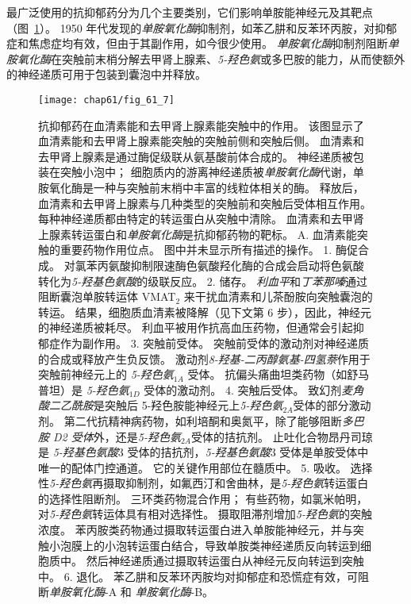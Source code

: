 最广泛使用的抗抑郁药分为几个主要类别，它们影响单胺能神经元及其靶点（图~\ref{fig:61_7}）。
1950 年代发现的\textit{单胺氧化酶}抑制剂，如苯乙肼和反苯环丙胺，对抑郁症和焦虑症均有效，但由于其副作用，如今很少使用。
\textit{单胺氧化酶}抑制剂阻断\textit{单胺氧化酶}在突触前末梢分解去甲肾上腺素、\textit{5-羟色氨}或多巴胺的能力，从而使额外的神经递质可用于包装到囊泡中并释放。


\begin{figure}[htbp] \label{fig:61_7}
	\centering
	\texttt{[image: chap61/fig\_61\_7]}
	\caption{抗抑郁药在血清素能和去甲肾上腺素能突触中的作用。
	该图显示了血清素能和去甲肾上腺素能突触的突触前侧和突触后侧。
	血清素和去甲肾上腺素是通过酶促级联从氨基酸前体合成的。
	神经递质被包装在突触小泡中；
	细胞质内的游离神经递质被\textit{单胺氧化酶}代谢，单胺氧化酶是一种与突触前末梢中丰富的线粒体相关的酶。
	释放后，血清素和去甲肾上腺素与几种类型的突触前和突触后受体相互作用。
	每种神经递质都由特定的转运蛋白从突触中清除。
	血清素和去甲肾上腺素转运蛋白和\textit{单胺氧化酶}是抗抑郁药物的靶标。
	A. 血清素能突触的重要药物作用位点。
	图中并未显示所有描述的操作。
	1. 酶促合成。
	对氯苯丙氨酸抑制限速酶色氨酸羟化酶的合成会启动将色氨酸转化为\textit{5-羟基色氨酸}的级联反应。
	2. 储存。
	\textit{利血平}和\textit{丁苯那嗪}通过阻断囊泡单胺转运体 VMAT$_2$ 来干扰血清素和儿茶酚胺向突触囊泡的转运。
	结果，细胞质血清素被降解（见下文第 6 步），因此，神经元的神经递质被耗尽。
	利血平被用作抗高血压药物，但通常会引起抑郁症作为副作用。
	3. 突触前受体。
	突触前受体的激动剂对神经递质的合成或释放产生负反馈。
	激动剂\textit{8-羟基-二丙醇氨基-四氢萘}作用于突触前神经元上的 \textit{5-羟色氨}$_{1A}$ 受体。
	抗偏头痛曲坦类药物（如舒马普坦）是 \textit{5-羟色氨}$_{1D}$ 受体的激动剂。
	4. 突触后受体。
	致幻剂\textit{麦角酸二乙酰胺}是突触后 5-羟色胺能神经元上\textit{5-羟色氨}$_{2A}$受体的部分激动剂。
	第二代抗精神病药物，如利培酮和奥氮平，除了能够阻断\textit{多巴胺 D2 受体}外，还是\textit{5-羟色氨}$_{2A}$受体的拮抗剂。
	止吐化合物昂丹司琼是 \textit{5-羟基色氨酸}3 受体的拮抗剂，\textit{5-羟基色氨酸}3 受体是单胺受体中唯一的配体门控通道。
	它的关键作用部位在髓质中。
	5. 吸收。
	选择性\textit{5-羟色氨}再摄取抑制剂，如氟西汀和舍曲林，是\textit{5-羟色氨}转运蛋白的选择性阻断剂。
	三环类药物混合作用；
	有些药物，如氯米帕明，对\textit{5-羟色氨}转运体具有相对选择性。
	摄取阻滞剂增加\textit{5-羟色氨}的突触浓度。
	苯丙胺类药物通过摄取转运蛋白进入单胺能神经元，并与突触小泡膜上的小泡转运蛋白结合，导致单胺类神经递质反向转运到细胞质中。
	然后神经递质通过摄取转运蛋白从神经元反向转运到突触中。
	6. 退化。
	苯乙肼和反苯环丙胺均对抑郁症和恐慌症有效，可阻断\textit{单胺氧化酶}-A 和 \textit{单胺氧化酶}-B。
}
\end{figure}
